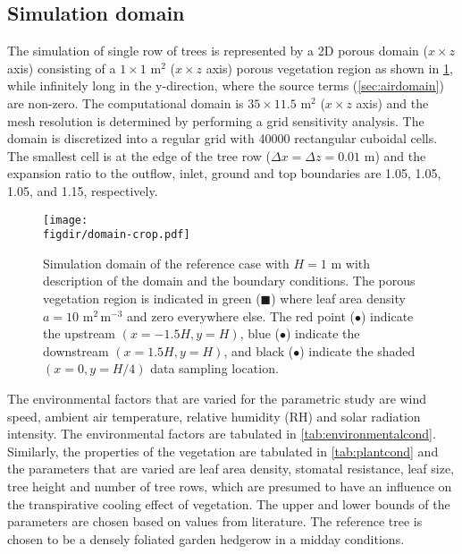 \subsection{Simulation domain}
The simulation of single row of trees is represented by a 2D porous domain ($x\times z$ axis) consisting of a $1\times1$ m$^2$ ($x\times z$ axis) porous vegetation region as shown in \cref{fig:domain}, while infinitely long in the y-direction, where the source terms (\cref{sec:airdomain}) are non-zero. The computational domain is $35\times11.5$ m$^2$ ($x\times z$ axis) and the mesh resolution is determined by performing a grid sensitivity analysis. The domain is discretized into a regular grid with \num{40000} rectangular cuboidal cells. The smallest cell is at the edge of the tree row ($\Delta x = \Delta z = 0.01$ m) and the expansion ratio to the outflow, inlet, ground and top boundaries are 1.05, 1.05, 1.05, and 1.15, respectively. 

	\begin{figure}[h]
	\centering
	\texttt{[image: \\figdir/domain-crop.pdf]}
	\caption{Simulation domain of the reference case with $H=1$ m with description of the domain and the boundary conditions. The porous vegetation region is indicated in green ({\color{flatuidarkgreen}$\blacksquare$}) where leaf area density $a=10$ m$^2$\,m$^{-3}$ and zero everywhere else. The red point ({\color{flatuidarkred}$\bullet$}) indicate the upstream $(x=-1.5H,y=H)$, blue ({\color{flatuidarkblue}$\bullet$}) indicate the downstream $(x=1.5H,y=H)$, and black ($\bullet$) indicate the shaded $(x=0,y=H/4)$ data sampling location.}
	\label{fig:domain}
	\end{figure}

The environmental factors that are varied for the parametric study are wind speed, ambient air temperature, relative humidity (RH) and solar radiation intensity. The environmental factors are tabulated in \cref{tab:environmentalcond}.  Similarly, the properties of the vegetation are tabulated in \cref{tab:plantcond} and the parameters that are varied are leaf area density, stomatal resistance, leaf size, tree height and number of tree rows, which are presumed to have an influence on the transpirative cooling effect of vegetation. The upper and lower bounds of the parameters are chosen based on values from literature. The reference tree is chosen to be a densely foliated garden hedgerow in a midday conditions. 


